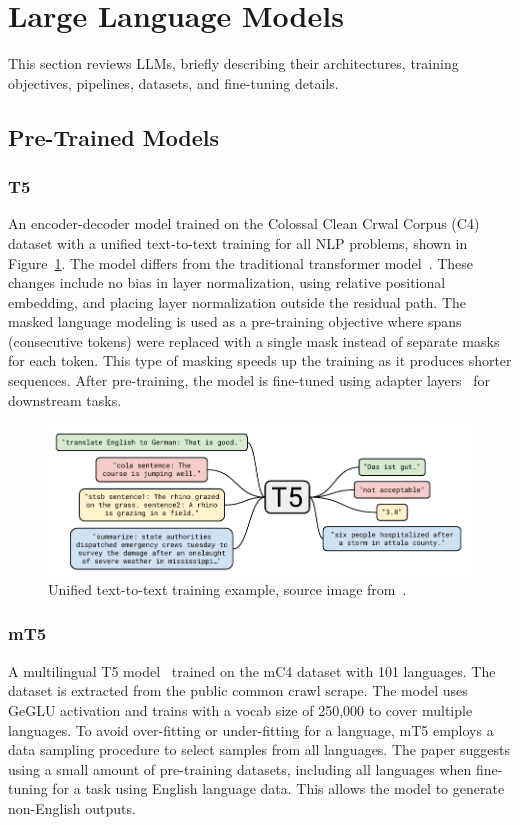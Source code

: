 \section{Large Language Models}
\label{sec_review}
This section reviews LLMs, briefly describing their architectures, training objectives, pipelines, datasets, and fine-tuning details.      
\subsection{Pre-Trained Models}
\subsubsection{T5~\cite{T5}}
An encoder-decoder model trained on the Colossal Clean Crwal Corpus (C4) dataset with a unified text-to-text training for all NLP problems, shown in Figure~\ref{t5_image}. The model differs from the traditional transformer model~\cite{Transformers}. These changes include no bias in layer normalization, using relative positional embedding, and placing layer normalization outside the residual path. The masked language modeling is used as a pre-training objective where spans (consecutive tokens) were replaced with a single mask instead of separate masks for each token. This type of masking speeds up the training as it produces shorter sequences. After pre-training, the model is fine-tuned using adapter layers~\cite{LMAdapter} for downstream tasks.
\begin{figure}[tbp]
\centering
\includegraphics[width=1\columnwidth]{Figure/T5.png}
\caption{Unified text-to-text training example, source image from~\cite{T5}.}
\label{t5_image}
\end{figure}

\subsubsection{mT5~\cite{mT5}}
A multilingual T5 model~\cite{T5} trained on the mC4 dataset with 101 languages. The dataset is extracted from the public common crawl scrape. The model uses GeGLU activation and trains with a vocab size of 250,000 to cover multiple languages. To avoid over-fitting or under-fitting for a language, mT5 employs a data sampling procedure to select samples from all languages. The paper suggests using a small amount of pre-training datasets, including all languages when fine-tuning for a task using English language data. This allows the model to generate non-English outputs.  

